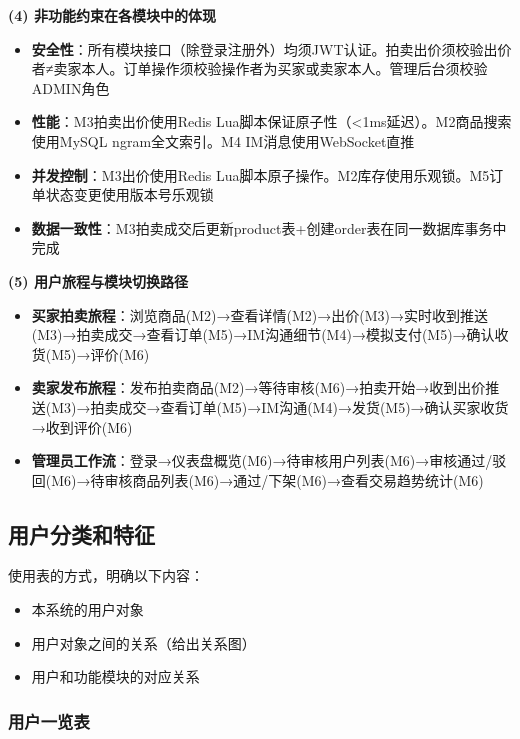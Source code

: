\documentclass[12pt,a4paper]{ctexart}
\numberwithin{figure}{section}
\numberwithin{table}{section}
\begin{document}
\textbf{(4) 非功能约束在各模块中的体现}

\begin{itemize}
    \item \textbf{安全性}：所有模块接口（除登录注册外）均须JWT认证。拍卖出价须校验出价者≠卖家本人。订单操作须校验操作者为买家或卖家本人。管理后台须校验ADMIN角色
    \item \textbf{性能}：M3拍卖出价使用Redis Lua脚本保证原子性（<1ms延迟）。M2商品搜索使用MySQL ngram全文索引。M4 IM消息使用WebSocket直推
    \item \textbf{并发控制}：M3出价使用Redis Lua脚本原子操作。M2库存使用乐观锁。M5订单状态变更使用版本号乐观锁
    \item \textbf{数据一致性}：M3拍卖成交后更新product表+创建order表在同一数据库事务中完成
\end{itemize}

\textbf{(5) 用户旅程与模块切换路径}

\begin{itemize}
    \item \textbf{买家拍卖旅程}：浏览商品(M2)→查看详情(M2)→出价(M3)→实时收到推送(M3)→拍卖成交→查看订单(M5)→IM沟通细节(M4)→模拟支付(M5)→确认收货(M5)→评价(M6)
    \item \textbf{卖家发布旅程}：发布拍卖商品(M2)→等待审核(M6)→拍卖开始→收到出价推送(M3)→拍卖成交→查看订单(M5)→IM沟通(M4)→发货(M5)→确认买家收货→收到评价(M6)
    \item \textbf{管理员工作流}：登录→仪表盘概览(M6)→待审核用户列表(M6)→审核通过/驳回(M6)→待审核商品列表(M6)→通过/下架(M6)→查看交易趋势统计(M6)
\end{itemize}

\subsection{用户分类和特征}

使用表的方式，明确以下内容：

\begin{itemize}
    \item 本系统的用户对象
    \item 用户对象之间的关系（给出关系图）
    \item 用户和功能模块的对应关系
\end{itemize}

\subsubsection{用户一览表}
\end{document}
